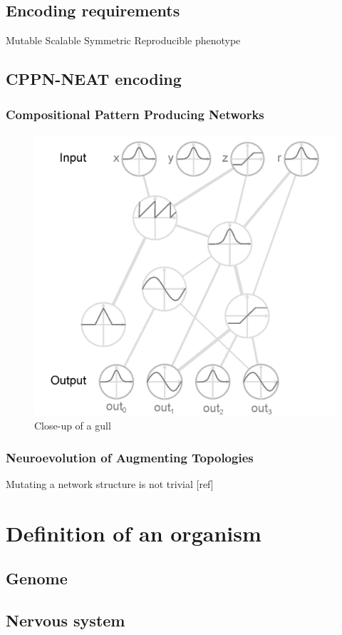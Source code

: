 \subsection{Encoding requirements}
Mutable
Scalable
Symmetric
Reproducible phenotype

\subsection{CPPN-NEAT encoding}
\citep{stanley2007compositional}

\subsubsection{Compositional Pattern Producing Networks}

\begin{figure}
  \centering
  \includegraphics[width=\textwidth]{figure/CPPN}
  \caption{Close-up of a gull} \label{fig:gull} 
\end{figure}

\subsubsection{Neuroevolution of Augmenting
Topologies}
Mutating a network structure is not trivial [ref]

\section{Definition of an organism}

\subsection{Genome}

\subsection{Nervous system} \label{subsec:nervousSystem}